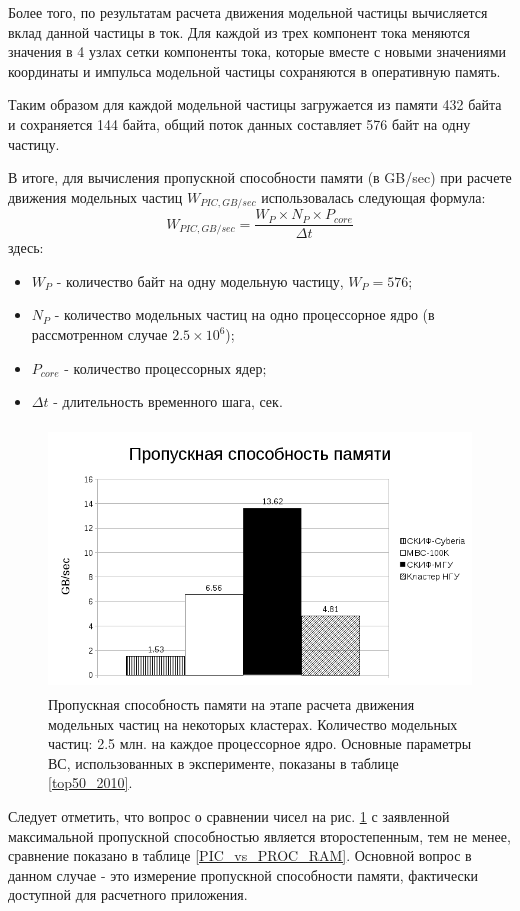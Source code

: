 Более того, по результатам расчета движения модельной частицы вычисляется вклад данной частицы в ток. Для каждой из трех компонент тока меняются значения в 4 узлах сетки компоненты тока, которые вместе с новыми значениями координаты и импульса модельной частицы сохраняются в оперативную память.

Таким образом для каждой модельной частицы загружается из памяти 432 байта и сохраняется 144 байта, общий поток данных составляет 576 байт на одну частицу.

В итоге, для вычисления пропускной способности памяти (в GB/sec) при расчете движения модельных частиц $W_{PIC,GB/sec}$ использовалась следующая формула:
\begin{equation}
W_{PIC,GB/sec} = \frac{W_P\times N_P \times P_{core}}{\Delta t}
\label{RAM_performance}
\end{equation}
здесь:
\begin{itemize}
	\item $W_P$ - количество байт на одну модельную частицу, $W_P = 576$;
	\item $N_P$ - количество модельных частиц на одно процессорное ядро (в рассмотренном случае $2.5\times 10^6$);  
	\item $P_{core}$ - количество процессорных ядер;
	\item $\Delta t$  - длительность временного шага, сек.
\end{itemize}	




\begin{figure}[htb]
	\begin{center}
		\includegraphics[height=7cm,keepaspectratio]{images/data_proc_throughput_GBsec.png}
	\end{center}
	\caption{Пропускная способность памяти на этапе расчета движения модельных частиц на некоторых кластерах. Количество модельных частиц: 2.5 млн. на каждое процессорное ядро. Основные параметры ВС, использованных в эксперименте, показаны в таблице \ref{top50_2010}.}
	\label{PIC_RAM}
\end{figure}
Следует отметить, что вопрос о сравнении чисел на рис. \ref{PIC_RAM} с заявленной максимальной пропускной способностью 
является второстепенным, тем не менее, сравнение показано в таблице \ref{PIC_vs_PROC_RAM}. Основной вопрос в данном случае - это измерение пропускной способности памяти,  фактически доступной для расчетного приложения.

